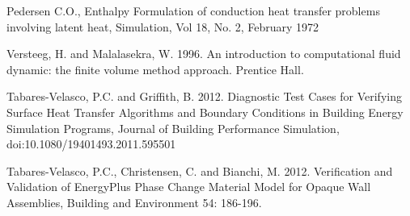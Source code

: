 Pedersen C.O., Enthalpy Formulation of conduction heat transfer problems involving latent heat, Simulation, Vol 18, No. 2, February 1972

Versteeg, H. and Malalasekra, W. 1996. An introduction to computational fluid dynamic: the finite volume method approach. Prentice Hall.

Tabares-Velasco, P.C. and Griffith, B. 2012. Diagnostic Test Cases for Verifying Surface Heat Transfer Algorithms and Boundary Conditions in Building Energy Simulation Programs, Journal of Building Performance Simulation, doi:10.1080/19401493.2011.595501

Tabares-Velasco, P.C., Christensen, C. and Bianchi, M. 2012. Verification and Validation of EnergyPlus Phase Change Material Model for Opaque Wall Assemblies, Building and Environment 54: 186-196.
